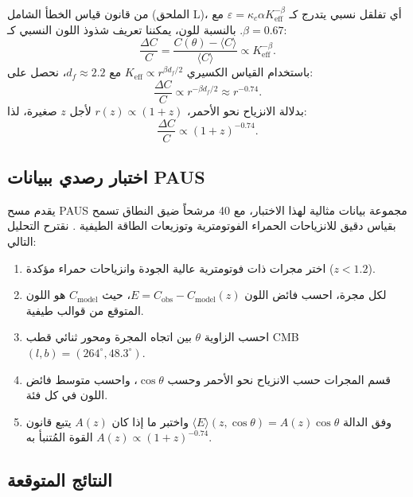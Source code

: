\documentclass[12pt,a4paper]{article}
\newcommand{\Keff}{K_{\mathrm{eff}}}
\begin{document}
	من قانون قياس الخطأ الشامل (الملحق L)، أي تفلقل نسبي يتدرج كـ \(\varepsilon = \kappa_c \alpha \Keff^{-\beta}\) مع \(\beta = 0.67\). بالنسبة للون، يمكننا تعريف شذوذ اللون النسبي كـ:
	\begin{equation}
		\frac{\Delta C}{C} = \frac{C(\theta) - \langle C \rangle}{\langle C \rangle} \propto \Keff^{-\beta}.
	\end{equation}
	باستخدام القياس الكسيري \(\Keff \propto r^{\beta d_f/2}\) مع \(d_f \approx 2.2\)، نحصل على:
	\begin{equation}
		\frac{\Delta C}{C} \propto r^{-\beta d_f/2} \approx r^{-0.74}.
	\end{equation}
	بدلالة الانزياح نحو الأحمر، \(r(z) \propto (1+z)\) لأجل \(z\) صغيرة، لذا:
	\begin{equation}
		\frac{\Delta C}{C} \propto (1+z)^{-0.74}.
	\end{equation}
	
	\subsection{اختبار رصدي ببيانات PAUS}
	
	يقدم مسح PAUS مجموعة بيانات مثالية لهذا الاختبار، مع 40 مرشحاً ضيق النطاق تسمح بقياس دقيق للانزياحات الحمراء الفوتومترية وتوزيعات الطاقة الطيفية \cite{Alarcon2019}. نقترح التحليل التالي:
	
	\begin{enumerate}
		\item اختر مجرات ذات فوتومترية عالية الجودة وانزياحات حمراء مؤكدة (\(z < 1.2\)).
		\item لكل مجرة، احسب فائض اللون \(E = C_{\mathrm{obs}} - C_{\mathrm{model}}(z)\)، حيث \(C_{\mathrm{model}}\) هو اللون المتوقع من قوالب طيفية.
		\item احسب الزاوية \(\theta\) بين اتجاه المجرة ومحور ثنائي قطب CMB \((l,b) = (264^\circ, 48.3^\circ)\).
		\item قسم المجرات حسب الانزياح نحو الأحمر وحسب \(\cos\theta\)، واحسب متوسط فائض اللون في كل فئة.
		\item وفق الدالة \(\langle E \rangle(z,\cos\theta) = A(z) \cos\theta\) واختبر ما إذا كان \(A(z)\) يتبع قانون القوة المُتنبأ به \(A(z) \propto (1+z)^{-0.74}\).
	\end{enumerate}
	
	\subsection{النتائج المتوقعة}
	
\end{document}
